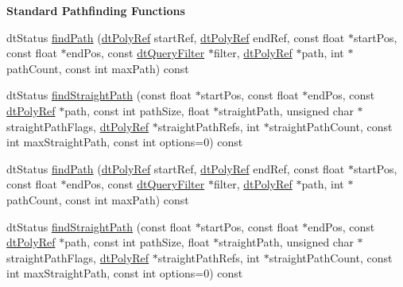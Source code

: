 \begin{Indent}\textbf{ Standard Pathfinding Functions}\par
\begin{DoxyCompactItemize}
\item 
dt\+Status \hyperlink{classdtNavMeshQuery_a9d86502949fcd4f96ffd350d4ef69e3c}{find\+Path} (\hyperlink{group__detour_gab4e0b2257a670c1a800057999612b466}{dt\+Poly\+Ref} start\+Ref, \hyperlink{group__detour_gab4e0b2257a670c1a800057999612b466}{dt\+Poly\+Ref} end\+Ref, const float $\ast$start\+Pos, const float $\ast$end\+Pos, const \hyperlink{classdtQueryFilter}{dt\+Query\+Filter} $\ast$filter, \hyperlink{group__detour_gab4e0b2257a670c1a800057999612b466}{dt\+Poly\+Ref} $\ast$path, int $\ast$path\+Count, const int max\+Path) const
\item 
dt\+Status \hyperlink{classdtNavMeshQuery_ac160434c85bdf9edec24fa621f120d2d}{find\+Straight\+Path} (const float $\ast$start\+Pos, const float $\ast$end\+Pos, const \hyperlink{group__detour_gab4e0b2257a670c1a800057999612b466}{dt\+Poly\+Ref} $\ast$path, const int path\+Size, float $\ast$straight\+Path, unsigned char $\ast$straight\+Path\+Flags, \hyperlink{group__detour_gab4e0b2257a670c1a800057999612b466}{dt\+Poly\+Ref} $\ast$straight\+Path\+Refs, int $\ast$straight\+Path\+Count, const int max\+Straight\+Path, const int options=0) const
\item 
dt\+Status \hyperlink{classdtNavMeshQuery_a9d86502949fcd4f96ffd350d4ef69e3c}{find\+Path} (\hyperlink{group__detour_gab4e0b2257a670c1a800057999612b466}{dt\+Poly\+Ref} start\+Ref, \hyperlink{group__detour_gab4e0b2257a670c1a800057999612b466}{dt\+Poly\+Ref} end\+Ref, const float $\ast$start\+Pos, const float $\ast$end\+Pos, const \hyperlink{classdtQueryFilter}{dt\+Query\+Filter} $\ast$filter, \hyperlink{group__detour_gab4e0b2257a670c1a800057999612b466}{dt\+Poly\+Ref} $\ast$path, int $\ast$path\+Count, const int max\+Path) const
\item 
dt\+Status \hyperlink{classdtNavMeshQuery_ac160434c85bdf9edec24fa621f120d2d}{find\+Straight\+Path} (const float $\ast$start\+Pos, const float $\ast$end\+Pos, const \hyperlink{group__detour_gab4e0b2257a670c1a800057999612b466}{dt\+Poly\+Ref} $\ast$path, const int path\+Size, float $\ast$straight\+Path, unsigned char $\ast$straight\+Path\+Flags, \hyperlink{group__detour_gab4e0b2257a670c1a800057999612b466}{dt\+Poly\+Ref} $\ast$straight\+Path\+Refs, int $\ast$straight\+Path\+Count, const int max\+Straight\+Path, const int options=0) const
\end{DoxyCompactItemize}
\end{Indent}

